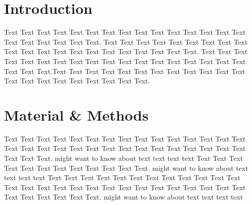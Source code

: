 \documentclass{frontiersMED} %
\begin{document}
\section{Introduction}

%
%
Text Text Text Text Text Text  Text Text Text Text Text Text Text Text Text  Text Text Text Text Text Text. Text Text Text Text Text Text  Text Text Text Text Text Text Text Text Text  Text Text Text Text Text Text. Text Text Text Text Text Text  Text Text Text Text Text Text Text Text Text  Text Text Text Text Text Text.Text Text Text Text Text Text  Text Text Text Text Text Text Text Text Text  Text Text Text Text Text Text.

\section{Material \& Methods}

Text Text Text Text Text Text  Text Text Text Text Text Text Text Text Text  Text Text Text Text Text Text Text Text Text Text  Text Text Text Text Text Text  Text Text.  \cite{Neuro2013} might want to know about  text text text text Text Text Text Text  Text Text Text Text Text Text  Text Text. \citep{Gene2012} might want to know about  text text text text
Text Text Text Text Text Text  Text Text Text Text Text Text Text Text Text  Text Text Text Text Text Text Text Text Text Text  Text Text Text Text Text Text  Text Text.  \cite{Neurobot2013} might want to know about  text text text text
\end{document}
